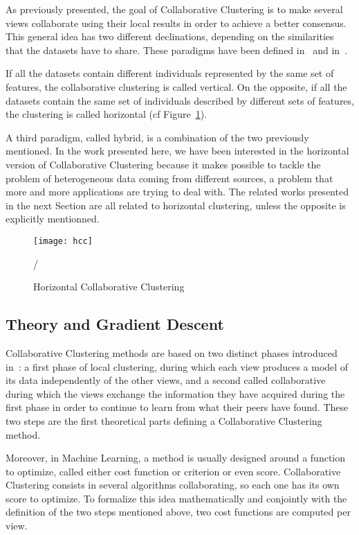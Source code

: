     As previously presented, the goal of Collaborative Clustering is to make several views collaborate using their local results in order to achieve a better consensus. This general idea has two different declinations, depending on the similarities that the datasets have to share. These paradigms have been defined in~\cite{pedrycz2005knowledge} and in~\cite{grozavu2010topological}.

    If all the datasets contain different individuals represented by the same set of features, the collaborative clustering is called vertical. On the opposite, if all the datasets contain the same set of individuals described by different sets of features, the clustering is called horizontal (cf Figure~\ref{fig:hor_cc}).
    
    A third paradigm, called hybrid, is a combination of the two previously mentioned. In the work presented here, we have been interested in the horizontal version of Collaborative Clustering because it makes possible to tackle the problem of heterogeneous data coming from different sources, a problem that more and more applications are trying to deal with. The related works presented in the next Section are all related to horizontal clustering, unless the opposite is explicitly mentionned.
    \vspace{.8cm}

        \begin{figure}[h]
            \centering
            \texttt{[image: hcc]}
            \caption{Horizontal Collaborative Clustering}/
\label{fig:hor_cc}
        \end{figure}

    \subsection{Theory and Gradient Descent}
\label{sec:theo_grad_desc}
    
    Collaborative Clustering methods are based on two distinct phases introduced in~\cite{pedrycz2002collaborative}: a first phase of local clustering, during which each view produces a model of its data independently of the other views, and a second called collaborative during which the views exchange the information they have acquired during the first phase in order to continue to learn from what their peers have found. These two steps are the first theoretical parts defining a Collaborative Clustering method.

    Moreover, in Machine Learning, a method is usually designed around a function to optimize, called either cost function or criterion or even score. Collaborative Clustering consists in several algorithms collaborating, so each one has its own score to optimize. To formalize this idea mathematically and conjointly with the definition of the two steps mentioned above, two cost functions are computed per view.

